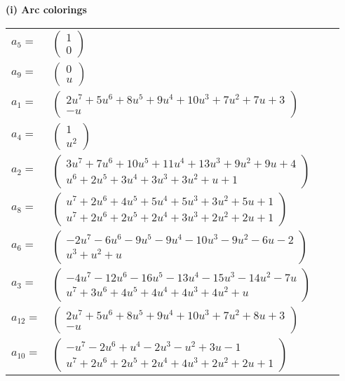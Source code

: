 \documentclass[1p]{elsarticle_modified}
\theoremstyle{definition}
\begin{document}
\flushleft \textbf{(i) Arc colorings}\\
\begin{tabular}{m{7pt} m{180pt} m{7pt} m{180pt} }
\flushright $a_{5}=$&$\begin{pmatrix}1\\0\end{pmatrix}$ \\
\flushright $a_{9}=$&$\begin{pmatrix}0\\u\end{pmatrix}$ \\
\flushright $a_{1}=$&$\begin{pmatrix}2 u^7+5 u^6+8 u^5+9 u^4+10 u^3+7 u^2+7 u+3\\- u\end{pmatrix}$ \\
\flushright $a_{4}=$&$\begin{pmatrix}1\\u^2\end{pmatrix}$ \\
\flushright $a_{2}=$&$\begin{pmatrix}3 u^7+7 u^6+10 u^5+11 u^4+13 u^3+9 u^2+9 u+4\\u^6+2 u^5+3 u^4+3 u^3+3 u^2+u+1\end{pmatrix}$ \\
\flushright $a_{8}=$&$\begin{pmatrix}u^7+2 u^6+4 u^5+5 u^4+5 u^3+3 u^2+5 u+1\\u^7+2 u^6+2 u^5+2 u^4+3 u^3+2 u^2+2 u+1\end{pmatrix}$ \\
\flushright $a_{6}=$&$\begin{pmatrix}-2 u^7-6 u^6-9 u^5-9 u^4-10 u^3-9 u^2-6 u-2\\u^3+u^2+u\end{pmatrix}$ \\
\flushright $a_{3}=$&$\begin{pmatrix}-4 u^7-12 u^6-16 u^5-13 u^4-15 u^3-14 u^2-7 u\\u^7+3 u^6+4 u^5+4 u^4+4 u^3+4 u^2+u\end{pmatrix}$ \\
\flushright $a_{12}=$&$\begin{pmatrix}2 u^7+5 u^6+8 u^5+9 u^4+10 u^3+7 u^2+8 u+3\\- u\end{pmatrix}$ \\
\flushright $a_{10}=$&$\begin{pmatrix}- u^7-2 u^6+u^4-2 u^3- u^2+3 u-1\\u^7+2 u^6+2 u^5+2 u^4+4 u^3+2 u^2+2 u+1\end{pmatrix}$ \\

\end{tabular}
\end{document}
